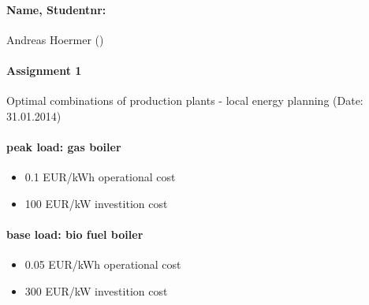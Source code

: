 \documentclass{article}
\begin{document}
	\paragraph{Name, Studentnr: }Andreas Hoermer ()
	\paragraph{Assignment 1}Optimal combinations of production plants - local energy planning (Date: 31.01.2014)
	\paragraph{peak load: gas boiler}
		\begin{itemize}
			\item 0.1 EUR/kWh operational cost
			\item 100 EUR/kW investition cost
		\end{itemize}
	\paragraph{base load: bio fuel boiler}
		\begin{itemize}
			\item 0.05 EUR/kWh operational cost
			\item 300 EUR/kW investition cost
		\end{itemize}
\end{document}
